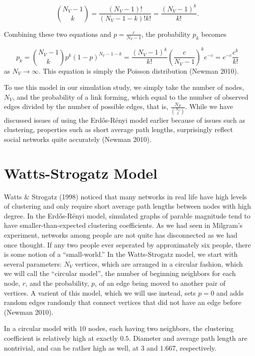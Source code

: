 \documentclass[12pt,twoside]{amherstthesis}
\begin{document}
  \[{N_{V} - 1 \choose k} = \frac {(N_{V} - 1)!} {(N_{V} - 1 - k)!k!} = \frac {(N_{V} - 1)^{k}} {k!}.\]
  
  Combining these two equations and \(p = \frac {c} {N_{V} - 1}\), the
  probability \(p_{k}\) becomes
  
  \[p_{k} = {N_{V} -1 \choose k}p^{k}(1 - p)^{N_{V} - 1 - k} = \frac {(N_{V} - 1)^{k}} {k!}\left(\frac {c} {N_{V} - 1}\right)^{k}e^{-c} = e^{-c} \frac{c^{k}} {k!}\]
  as \(N_{V} \to \infty\). This equation is simply the Poisson
  distribution (Newman 2010).
  
  To use this model in our simulation study, we simply take the number of
  nodes, \(N_{V}\), and the probability of a link forming, which equal to
  the number of observed edges divided by the number of possible edges,
  that is, \(\frac{N_{E}} {{N_{V} \choose 2}}\). While we have discussed
  issues of using the Erdős-Rényi model earlier because of issues such as
  clustering, properties such as short average path lengths, surprisingly
  reflect social networks quite accurately (Newman 2010).
  
  \section{Watts-Strogatz Model}\label{watts-strogatz-model}
  
  Watts \& Strogatz (1998) noticed that many networks in real life have
  high levels of clustering and only require short average path lengths
  between nodes with high degree. In the Erdős-Rényi model, simulated
  graphs of parable magnitude tend to have smaller-than-expected
  clustering coefficients. As we had seen in Milgram's experiment,
  networks among people are not quite has disconnected as we had once
  thought. If any two people ever seperated by approximately six people,
  there is some notion of a ``small-world.'' In the Watts-Strogatz model,
  we start with several parameters: \(N_V\) vertices, which are arranged
  in a circular fashion, which we will call the ``circular model'', the
  number of beginning neighbors for each node, \(r\), and the probability,
  \(p\), of an edge being moved to another pair of vertices. A varient of
  this model, which we will use instead, sets \(p = 0\) and adds random
  edges randomly that connect vertices that did not have an edge before
  (Newman 2010).
  
  In a circular model with \(10\) nodes, each having two neighbors, the
  clustering coefficient is relatively high at exactly \(0.5\). Diameter
  and average path length are nontrivial, and can be rather high as well,
  at \(3\) and \(1.667\), respectively.
  
\end{document}
